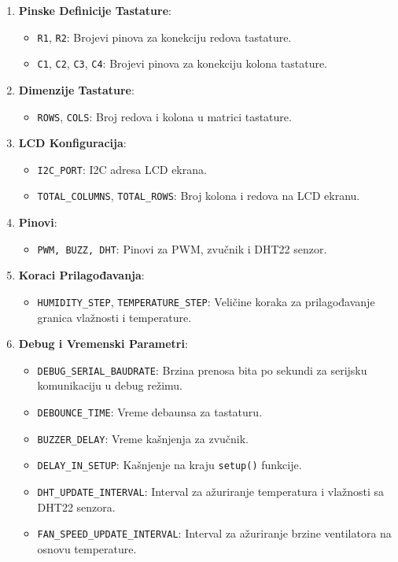 \documentclass[a4paper, 12pt]{article}
\begin{document}
\begin{enumerate}

	\item \textbf{Pinske Definicije Tastature}:

	\begin{itemize}
    		\item \texttt{R1}, \texttt{R2}: Brojevi pinova za konekciju redova tastature.
    		\item \texttt{C1}, \texttt{C2}, \texttt{C3}, \texttt{C4}: Brojevi pinova za konekciju kolona tastature.
	\end{itemize}

	\item \textbf{Dimenzije Tastature}:
	\begin{itemize}
    		\item \texttt{ROWS}, \texttt{COLS}: Broj redova i kolona u matrici tastature.
	\end{itemize}
	\item \textbf{LCD Konfiguracija}:
	\begin{itemize}
		\item \texttt{I2C\_PORT}: I2C adresa LCD ekrana.
    		\item \texttt{TOTAL\_COLUMNS}, \texttt{TOTAL\_ROWS}: Broj kolona i redova na LCD ekranu.
	\end{itemize}
	\item \textbf{Pinovi}:
	\begin{itemize}
    		\item \texttt{PWM, BUZZ, DHT}: Pinovi za PWM, zvučnik i DHT22 senzor.
	\end{itemize}

	\item \textbf{Koraci Prilagođavanja}:
	\begin{itemize}
    		\item \texttt{HUMIDITY\_STEP}, \texttt{TEMPERATURE\_STEP}: Veličine koraka za prilagođavanje granica vlažnosti i temperature.
	\end{itemize}

	\item \textbf{Debug i Vremenski Parametri}:
	\begin{itemize}
		\item \texttt{DEBUG\_SERIAL\_BAUDRATE}: Brzina prenosa bita po sekundi za serijsku komunikaciju u debug režimu.
		\item \texttt{DEBOUNCE\_TIME}: Vreme debaunsa za tastaturu.
		\item \texttt{BUZZER\_DELAY}: Vreme kašnjenja za zvučnik.
		\item \texttt{DELAY\_IN\_SETUP}: Kašnjenje na kraju \texttt{setup()} funkcije.
		\item \texttt{DHT\_UPDATE\_INTERVAL}: Interval za ažuriranje temperatura i vlažnosti sa DHT22 senzora.
		\item \texttt{FAN\_SPEED\_UPDATE\_INTERVAL}: Interval za ažuriranje brzine ventilatora na osnovu temperature.
	\end{itemize}
	

\end{enumerate}
\end{document}
